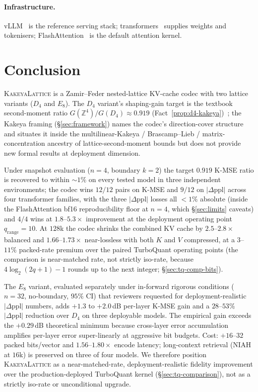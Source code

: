 \documentclass[10pt,a4paper]{article}
\theoremstyle{definition}
\theoremstyle{plain}
\newcommand{\Z}{\mathbb{Z}}
\begin{document}
\paragraph{Infrastructure.}
vLLM~\cite{vllm} is the reference serving stack;
transformers~\cite{huggingface-transformers} supplies weights and
tokenisers; FlashAttention~\cite{flashattention} is the default
attention kernel.
\section{Conclusion}

\textsc{KakeyaLattice} is a Zamir--Feder nested-lattice KV-cache
codec with two lattice variants ($D_4$ and $E_8$). The $D_4$
variant's shaping-gain target is the textbook second-moment ratio
$G(\Z^4)/G(D_4) \approx 0.919$
(Fact~\ref{prop:d4-kakeya})~\cite{zamir-feder,conway-sloane-book};
the Kakeya framing (\S\ref{sec:framework}) names the codec's
direction-cover structure and situates it inside the
multilinear-Kakeya / Brascamp--Lieb / matrix-concentration ancestry
of lattice-second-moment bounds but does not provide new formal
results at deployment dimension.

Under snapshot evaluation ($n=4$, boundary $k=2$) the target
$0.919$ K-MSE ratio is recovered to within $\sim\!1\%$ on every
tested model in three independent environments; the codec wins
$12/12$ pairs on K-MSE and $9/12$ on $|\Delta\mathrm{ppl}|$
across four transformer families, with the three
$|\Delta\mathrm{ppl}|$ losses all $<\!1\%$ absolute (inside the
FlashAttention bf16 reproducibility floor at $n=4$, which
\S\ref{sec:limits} caveats) and $4/4$ wins at
$1.8$--$5.3\times$ improvement at the deployment operating
point $q_\mathrm{range}=10$. At $128$k the codec shrinks the
combined KV cache by $2.5$--$2.8\times$ balanced and
$1.66$--$1.73\times$ near-lossless with both $K$ and $V$
compressed, at a $3$--$11\%$ packed-rate premium over the paired
TurboQuant operating points (the comparison is near-matched rate,
not strictly iso-rate, because $4\log_2(2q+1)-1$ rounds up to the
next integer; \S\ref{sec:tq-comp-bits}).

The $E_8$ variant, evaluated separately under in-forward rigorous
conditions ($n=32$, no-boundary, $95\%$ CI) that reviewers
requested for deployment-realistic $|\Delta\mathrm{ppl}|$ numbers,
adds $+1.3$ to
$+2.0\,$dB per-layer K-MSE gain and a $28$--$53\%$
$|\Delta\mathrm{ppl}|$ reduction over $D_4$ on three deployable
models. The empirical gain exceeds the $+0.29\,$dB theoretical
minimum because cross-layer error accumulation amplifies
per-layer error super-linearly at aggressive bit budgets. Cost:
$+16$--$32$ packed bits/vector and $1.56$--$1.80\times$ encode
latency; long-context retrieval (NIAH at $16$k) is preserved on
three of four models. We therefore position \textsc{KakeyaLattice}
as a near-matched-rate, deployment-realistic fidelity
improvement over the production-deployed TurboQuant kernel
(\S\ref{sec:tq-comparison}), not as a strictly iso-rate or
unconditional upgrade.
\end{document}
